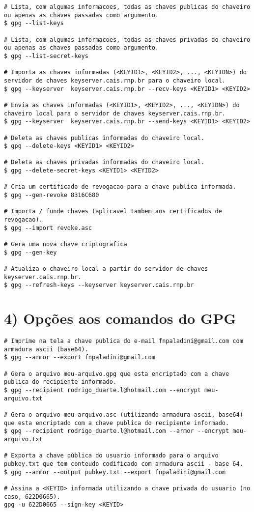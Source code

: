 \documentclass[a4paper,11pt]{article}
\theoremstyle{mytheor}
\begin{document}
\begin{lstlisting}
# Lista, com algumas informacoes, todas as chaves publicas do chaveiro ou apenas as chaves passadas como argumento.
$ gpg --list-keys

# Lista, com algumas informacoes, todas as chaves privadas do chaveiro ou apenas as chaves passadas como argumento.
$ gpg --list-secret-keys

# Importa as chaves informadas (<KEYID1>, <KEYID2>, ..., <KEYIDN>) do servidor de chaves keyserver.cais.rnp.br para o chaveiro local.
$ gpg --keyserver  keyserver.cais.rnp.br --recv-keys <KEYID1> <KEYID2>

# Envia as chaves informadas (<KEYID1>, <KEYID2>, ..., <KEYIDN>) do chaveiro local para o servidor de chaves keyserver.cais.rnp.br.
$ gpg --keyserver  keyserver.cais.rnp.br --send-keys <KEYID1> <KEYID2>

# Deleta as chaves publicas informadas do chaveiro local.
$ gpg --delete-keys <KEYID1> <KEYID2>

# Deleta as chaves privadas informadas do chaveiro local.
$ gpg --delete-secret-keys <KEYID1> <KEYID2>

# Cria um certificado de revogacao para a chave publica informada.
$ gpg --gen-revoke 8316C680

# Importa / funde chaves (aplicavel tambem aos certificados de revogacao).
$ gpg --import revoke.asc

# Gera uma nova chave criptografica
$ gpg --gen-key

# Atualiza o chaveiro local a partir do servidor de chaves keyserver.cais.rnp.br.
$ gpg --refresh-keys --keyserver keyserver.cais.rnp.br
\end{lstlisting}

\section*{4) Opções aos comandos do GPG}

\begin{lstlisting}
# Imprime na tela a chave publica do e-mail fnpaladini@gmail.com com armadura ascii (base64).
$ gpg --armor --export fnpaladini@gmail.com

# Gera o arquivo meu-arquivo.gpg que esta encriptado com a chave publica do recipiente informado.
$ gpg --recipient rodrigo_duarte.l@hotmail.com --encrypt meu-arquivo.txt

# Gera o arquivo meu-arquivo.asc (utilizando armadura ascii, base64) que esta encriptado com a chave publica do recipiente informado.
$ gpg --recipient rodrigo_duarte.l@hotmail.com --armor --encrypt meu-arquivo.txt

# Exporta a chave pública do usuario informado para o arquivo pubkey.txt que tem conteudo codificado com armadura ascii - base 64.
$ gpg --armor --output pubkey.txt --export fnpaladini@gmail.com

# Assina a <KEYID> informada utilizando a chave privada do usuario (no caso, 622D0665).
gpg -u 622D0665 --sign-key <KEYID>

\end{lstlisting}
\end{document}
